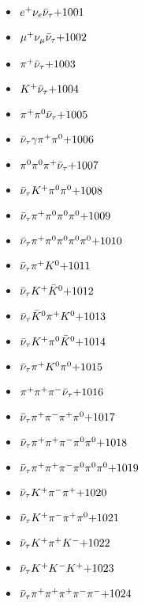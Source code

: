 
 \begin{multicols}{3} 
 \begin{itemize}
 \item $ e^{+} \nu_{e} \bar{\nu}_{\tau} \hfill{+1001}$
 \item $ \mu^{+} \nu_{\mu} \bar{\nu}_{\tau} \hfill{+1002}$
 \item $ \pi^{+} \bar{\nu}_{\tau} \hfill{+1003}$
 \item $ K^{+} \bar{\nu}_{\tau} \hfill{+1004}$
 \item $ \pi^{+} \pi^{0} \bar{\nu}_{\tau} \hfill{+1005}$
 \item $ \bar{\nu}_{\tau} \gamma \pi^{+} \pi^{0} \hfill{+1006}$
 \item $ \pi^{0} \pi^{0} \pi^{+} \bar{\nu}_{\tau} \hfill{+1007}$
 \item $ \bar{\nu}_{\tau} K^{+} \pi^{0} \pi^{0} \hfill{+1008}$
 \item $ \bar{\nu}_{\tau} \pi^{+} \pi^{0} \pi^{0} \pi^{0} \hfill{+1009}$
 \item $ \bar{\nu}_{\tau} \pi^{+} \pi^{0} \pi^{0} \pi^{0} \pi^{0} \hfill{+1010}$
 \item $ \bar{\nu}_{\tau} \pi^{+} K^{0} \hfill{+1011}$
 \item $ \bar{\nu}_{\tau} K^{+} \bar{K}^{0} \hfill{+1012}$
 \item $ \bar{\nu}_{\tau} \bar{K}^{0} \pi^{+} K^{0} \hfill{+1013}$
 \item $ \bar{\nu}_{\tau} K^{+} \pi^{0} \bar{K}^{0} \hfill{+1014}$
 \item $ \bar{\nu}_{\tau} \pi^{+} K^{0} \pi^{0} \hfill{+1015}$
 \item $ \pi^{+} \pi^{+} \pi^{-} \bar{\nu}_{\tau} \hfill{+1016}$
 \item $ \bar{\nu}_{\tau} \pi^{+} \pi^{-} \pi^{+} \pi^{0} \hfill{+1017}$
 \item $ \bar{\nu}_{\tau} \pi^{+} \pi^{+} \pi^{-} \pi^{0} \pi^{0} \hfill{+1018}$
 \item $ \bar{\nu}_{\tau} \pi^{+} \pi^{+} \pi^{-} \pi^{0} \pi^{0} \pi^{0} \hfill{+1019}$
 \item $ \bar{\nu}_{\tau} K^{+} \pi^{-} \pi^{+} \hfill{+1020}$
 \item $ \bar{\nu}_{\tau} K^{+} \pi^{-} \pi^{+} \pi^{0} \hfill{+1021}$
 \item $ \bar{\nu}_{\tau} K^{+} \pi^{+} K^{-} \hfill{+1022}$
 \item $ \bar{\nu}_{\tau} K^{+} K^{-} K^{+} \hfill{+1023}$
 \item $ \bar{\nu}_{\tau} \pi^{+} \pi^{+} \pi^{+} \pi^{-} \pi^{-} \hfill{+1024}$

\end{itemize}
\end{multicols}
